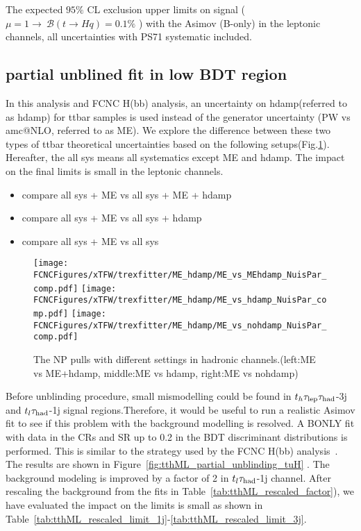 \begin{table}[H]
\caption{The expected $95\%$ CL exclusion upper limits on signal ( $\mu=1\to~\mathcal{B}(t\to Hq)=0.1\%$ ) with the Asimov (B-only) in the leptonic channels, all uncertainties with PS71 systematic included.}
\label{tab:tthML_ttbarPS_vs_ttbarPS71}

\end{table}


\subsection{partial unblined fit in low BDT region}
In this analysis and FCNC H(bb) analysis, an uncertainty on hdamp(referred to as hdamp) for ttbar samples is used instead of the generator uncertainty (PW vs amc@NLO, referred to as ME). We explore the difference between these two types of ttbar theoretical uncertainties based on the following setups(Fig.\ref{fig:xTFW_ME_vs_MEhdamp}). Hereafter, the all sys means all systematics except ME and hdamp. The impact on the final limits is small in the leptonic channels. 
\begin{itemize}
	\item compare all sys + ME  vs  all sys + ME + hdamp
	\item compare all sys + ME  vs  all sys + hdamp 
	\item compare all sys + ME  vs  all sys
\end{itemize}

\begin{figure}[H]
\centering
\texttt{[image: \\FCNCFigures/xTFW/trexfitter/ME\_hdamp/ME\_vs\_MEhdamp\_NuisPar\_comp.pdf]}
\texttt{[image: \\FCNCFigures/xTFW/trexfitter/ME\_hdamp/ME\_vs\_hdamp\_NuisPar\_comp.pdf]}
\texttt{[image: \\FCNCFigures/xTFW/trexfitter/ME\_hdamp/ME\_vs\_nohdamp\_NuisPar\_comp.pdf]}
\caption{The NP pulls with different settings in hadronic channels.(left:ME vs ME+hdamp, middle:ME vs hdamp, right:ME vs nohdamp)}
\label{fig:xTFW_ME_vs_MEhdamp}
\end{figure}

		

Before unblinding procedure, small mismodelling could be found  in $t_h\tau_\text{lep}{}\tau_\text{had}$-3j and $t_l\tau_\text{had}$-1j signal regions.Therefore, it would be useful to run a realistic Asimov fit to see if this problem with the background modelling is resolved. A BONLY fit with data in the CRs and SR up to 0.2 in the BDT discriminant distributions is performed. This is similar to the strategy used by the FCNC H(bb) analysis~\cite{ANA-TOPQ-2018-41-INT1}. The results are shown in Figure~\ref{fig:tthML_partial_unblinding_tuH}
\iffalse and Figure~\ref{fig:tthML_partial_unblinding_tcH} \fi. The background modeling is improved by a factor of 2 in $t_l\tau_\text{had}$-1j channel. After rescaling the background from the fits in Table~\ref{tab:tthML_rescaled_factor}), we have evaluated the impact on the limits is small as shown in Table~\ref{tab:tthML_rescaled_limit_1j}-\ref{tab:tthML_rescaled_limit_3j}. 


